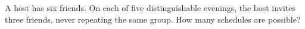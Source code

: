 A host has six friends. On each of five distinguishable evenings, the host invites three friends, never repeating the same group. How many schedules are possible?
